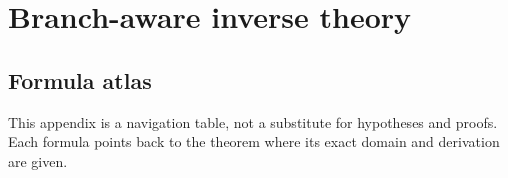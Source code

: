 \documentclass[11pt,a4paper,oneside,openany]{book}
\theoremstyle{definition}
\theoremstyle{remark}
\begin{document}
\part{Branch-aware inverse theory}
\label{part:inverse-q-theory}










\appendix



\chapter{Formula atlas}\label{app:atlas}

This appendix is a navigation table, not a substitute for hypotheses and proofs.  Each formula points back to the theorem where its exact domain and derivation are given.

\end{document}
